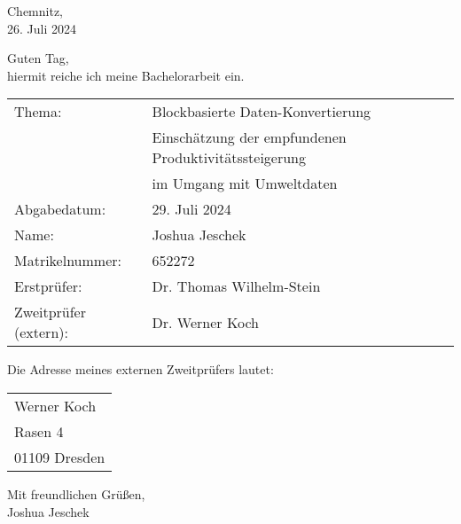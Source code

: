 \begin{flushright}
  Chemnitz,\\
  26. Juli 2024
\end{flushright}

\noindent
Guten Tag,\\
hiermit reiche ich meine Bachelorarbeit ein.

\vspace{\baselineskip}

\begin{tabular}{l l}
  Thema: & Blockbasierte Daten-Konvertierung \\
  & Einschätzung der empfundenen Produktivitätssteigerung \\
  & im Umgang mit Umweltdaten \\
  Abgabedatum: & 29. Juli 2024 \\
  Name: & Joshua Jeschek \\
  Matrikelnummer: & 652272 \\
  Erstprüfer: & Dr. Thomas Wilhelm-Stein \\
  Zweitprüfer (extern): & Dr. Werner Koch
\end{tabular}

\vspace{\baselineskip}
\noindent
Die Adresse meines externen Zweitprüfers lautet:

\vspace{\baselineskip}

\begin{tabular}{l}
Werner Koch\\
Rasen 4\\
01109 Dresden
\end{tabular}

\vspace{\baselineskip}
\noindent
Mit freundlichen Grüßen,\\
Joshua Jeschek
